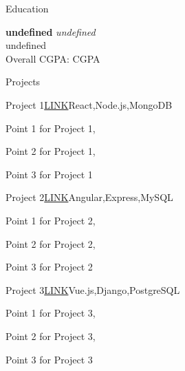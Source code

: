 \documentclass[
	11pt, %
]{resume} %
\begin{document}

\begin{rSection}{Education}
	
	\textbf{undefined} \hfill \textit{undefined} \\ 
	 undefined \\
	Overall CGPA: CGPA
	
\end{rSection}


\begin{rSection}{Projects}

	\begin{rSubsection}{Project 1}{\href{}{LINK}}{React,Node.js,MongoDB}{}
		\item Point 1 for Project 1,\item Point 2 for Project 1,\item Point 3 for Project 1
	\end{rSubsection}


	\begin{rSubsection}{Project 2}{\href{}{LINK}}{Angular,Express,MySQL}{}
		 \item Point 1 for Project 2,\item Point 2 for Project 2,\item Point 3 for Project 2 
	\end{rSubsection}


\begin{rSubsection}{Project 3}{\href{}{LINK}}{Vue.js,Django,PostgreSQL}{}
	\item Point 1 for Project 3,\item Point 2 for Project 3,\item Point 3 for Project 3
\end{rSubsection}

\end{rSection}
\end{document}

